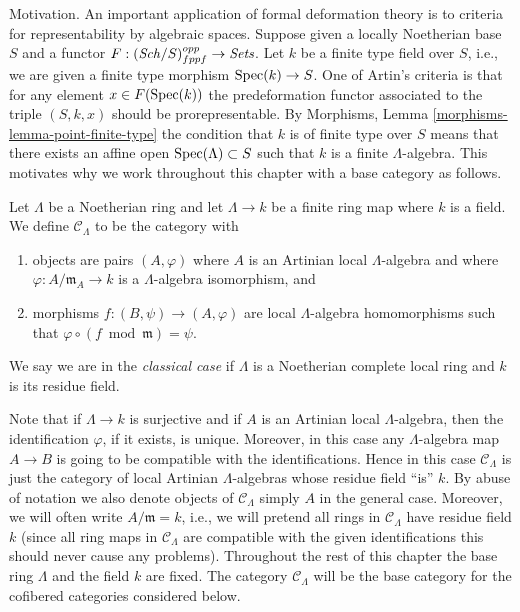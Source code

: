 \noindent
Motivation. An important application of formal deformation theory is
to criteria for representability by algebraic spaces. Suppose given a
locally Noetherian base $S$ and a functor
$F : (\mathit{Sch}/S)_{fppf}^{opp} \to \textit{Sets}$.
Let $k$ be a finite type field over $S$, i.e., we are given a
finite type morphism $\mathop{\mathrm{Spec}}(k) \to S$.
One of Artin's criteria is that for any element $x \in F(\mathop{\mathrm{Spec}}(k))$
the predeformation functor associated to
the triple $(S, k, x)$ should be prorepresentable. By
Morphisms, Lemma \ref{morphisms-lemma-point-finite-type}
the condition that $k$ is of finite type over $S$ means that there exists
an affine open $\mathop{\mathrm{Spec}}(\Lambda) \subset S$ such that $k$
is a finite $\Lambda$-algebra. This motivates why we work throughout
this chapter with a base category as follows.

\begin{definition}
\label{definition-CLambda}
Let $\Lambda$ be a Noetherian ring and let $\Lambda \to k$ be a finite
ring map where $k$ is a field. We define {\it $\mathcal{C}_\Lambda$} to be
the category with
\begin{enumerate}
\item objects are pairs $(A, \varphi)$ where $A$ is an Artinian local
$\Lambda$-algebra and where $\varphi : A/\mathfrak m_A \to k$ is a
$\Lambda$-algebra isomorphism, and
\item morphisms $f : (B, \psi) \to (A, \varphi)$ are local $\Lambda$-algebra
homomorphisms such that $\varphi \circ (f \bmod \mathfrak m) = \psi$.
\end{enumerate}
We say we are in the {\it classical case} if $\Lambda$ is a Noetherian
complete local ring and $k$ is its residue field.
\end{definition}

\noindent
Note that if $\Lambda \to k$ is surjective and if $A$ is an Artinian local
$\Lambda$-algebra, then the identification $\varphi$, if it exists,
is unique. Moreover, in this case any $\Lambda$-algebra map $A \to B$ is
going to be compatible with the identifications. Hence in this case
$\mathcal{C}_\Lambda$ is just the category of local Artinian $\Lambda$-algebras
whose residue field ``is'' $k$. By abuse of notation we also denote objects of
$\mathcal{C}_\Lambda$ simply $A$ in the general case. Moreover, we will
often write $A/\mathfrak m = k$, i.e., we will pretend all rings in
$\mathcal{C}_\Lambda$ have residue field $k$ (since all ring maps in
$\mathcal{C}_\Lambda$ are compatible with the given identifications this
should never cause any problems).
Throughout the rest of this chapter the base ring $\Lambda$ and the
field $k$ are fixed. The category $\mathcal{C}_\Lambda$ will be the base
category for the cofibered categories considered below.

